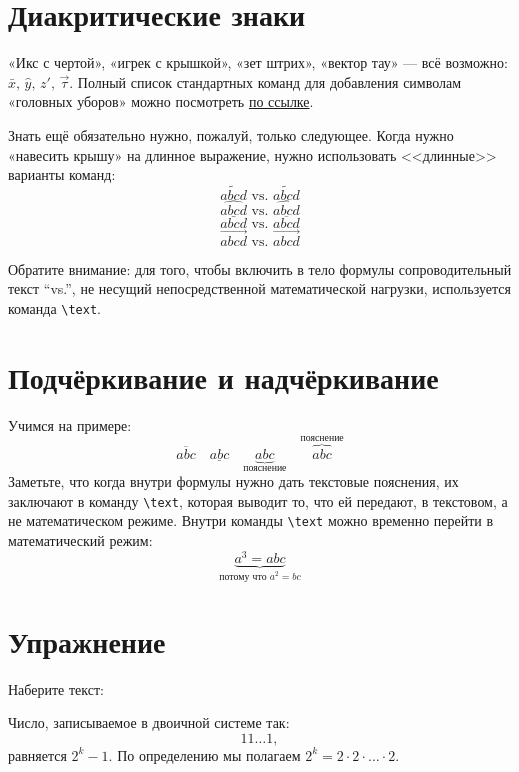 \section{Диакритические знаки}
\par «Икс с чертой», «игрек с крышкой», «зет штрих», «вектор тау» --- всё возможно: \(\bar{x},\, \hat{y},\, z',\, \vec{\tau}\). Полный список стандартных команд для добавления символам «головных уборов» можно посмотреть \href{https://en.wikibooks.org/wiki/LaTeX/Special_Characters#Math_mode}{по ссылке}.
\par Знать ещё обязательно нужно, пожалуй, только следующее. Когда нужно «навесить крышу» на длинное выражение, нужно использовать <<длинные>> варианты команд:\index{\hat=\widehat,\vec=\overrightarrow,\tilde=\widetilde}
\[\tilde{abcd} \text{ vs. } \widetilde{abcd}\]
\[\hat{abcd} \text{ vs. } \widehat{abcd}\]
\[\bar{abcd} \text{ vs. } \overline{abcd}\]
\[\vec{abcd} \text{ vs. } \overrightarrow{abcd}\]
\par Обратите внимание: для того, чтобы включить в тело формулы сопроводительный текст ``vs.'', не несущий непосредственной математической нагрузки, используется команда \verb"\text".

\section{Подчёркивание и надчёркивание}
\par Учимся на примере: \[\overline{abc}\quad \underline{abc}\quad \underbrace{abc}_{\text{пояснение}} \quad \overbrace{abc}^{\text{пояснение}}\]
Заметьте, что когда внутри формулы нужно дать текстовые пояснения, их заключают в команду \verb"\text", которая выводит то, что ей передают, в текстовом, а не математическом режиме. Внутри команды \verb"\text" можно временно перейти в математический режим:
\[ \underbrace{a^3=abc}_{\text{потому что \(a^2=bc\)}} \]

\section{Упражнение}
\begin{staticpart}
Наберите текст: 
\end{staticpart}
\par Число, записываемое в двоичной системе так: \[11\ldots 1,\] равняется \(2^k-1\).
По определению мы полагаем \(2^k=2 \cdot 2 \cdot\ldots\cdot 2\).

